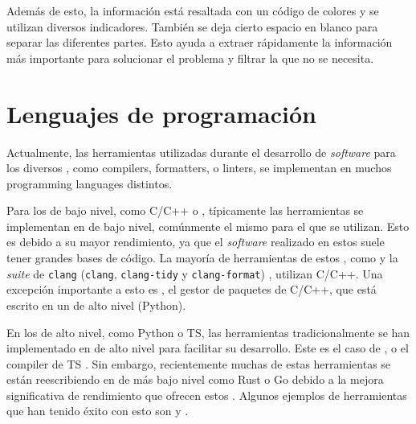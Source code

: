 Además de esto, la información está resaltada con un código de colores y se
utilizan diversos indicadores. También se deja cierto espacio en blanco para
separar las diferentes partes. Esto ayuda a extraer rápidamente la información
más importante para solucionar el problema y filtrar la que no se necesita.


\FloatBarrier

\section{Lenguajes de programación}\label{sec:programming-languages}

Actualmente, las herramientas utilizadas durante el desarrollo de
\textit{software} para los diversos ,
como \glspl{compiler}, \glspl{formatter}, o \glspl{linter}, se implementan en
muchos \glspl{programming language} distintos.

Para los  de bajo nivel, como C/C++ o
, típicamente las herramientas se implementan en
 de bajo nivel, comúnmente el mismo
para el que se utilizan. Esto es debido a su mayor rendimiento, ya que el
\textit{software} realizado en estos 
suele tener grandes bases de código. La mayoría de herramientas de estos
, como  y la
\textit{suite} de \verb!clang! (\verb!clang!, \verb!clang-tidy! y
\verb!clang-format!) \parencite{clang}, utilizan C/C++. Una excepción importante
a esto es , el gestor de paquetes de C/C++, que está escrito en
un  de alto nivel (Python).

En los  de alto nivel, como Python o
\gls{TS}, las herramientas tradicionalmente se han implementado en
 de alto nivel para facilitar su
desarrollo. Este es el caso de ,  o el
\gls{compiler} de \gls{TS} \parencite{tsc}. Sin embargo, recientemente muchas de
estas herramientas se están reescribiendo en  de más bajo nivel como Rust o Go debido a la mejora
significativa de rendimiento que ofrecen estos  \parencite{typescript-go}. Algunos ejemplos de herramientas
que han tenido éxito con esto son  y .
